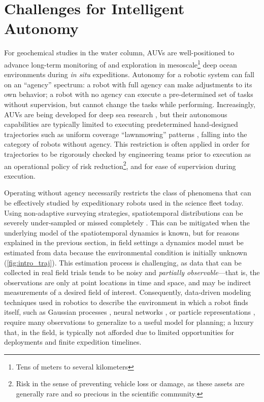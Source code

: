 \section{Challenges for Intelligent Autonomy}
For geochemical studies in the water column, AUVs are well-positioned to advance long-term monitoring of and exploration in mesoscale\footnote{Tens of meters to several kilometers} deep ocean environments during \emph{in situ} expeditions.
Autonomy for a robotic system can fall on an ``agency'' spectrum: a robot with full agency can make adjustments to its own behavior; a robot with no agency can execute a pre-determined set of tasks without supervision, but cannot change the tasks while performing.
Increasingly, AUVs are being developed for deep sea research \autocite{kaiser2016design,yuh2000design,okamoto2019visual,maki2014auv}, but their autonomous capabilities are typically limited to executing predetermined hand-designed trajectories such as uniform coverage ``lawnmowing'' patterns \autocite{camilli2010tracking}, falling into the category of robots without agency.
This restriction is often applied in order for trajectories to be rigorously checked by engineering teams prior to execution as an operational policy of risk reduction\footnote{Risk in the sense of preventing vehicle loss or damage, as these assets are generally rare and so precious in the scientific community.}, and for ease of supervision during execution.

Operating without agency necessarily restricts the class of phenomena that can be effectively studied by expeditionary robots used in the science fleet today.
Using non-adaptive surveying strategies, spatiotemporal distributions can be severely under-sampled or missed completely \autocite{flaspohler2019information, preston2019adaptive}.
This can be mitigated when the underlying model of the spatiotemporal dynamics is known, but for reasons explained in the previous section, in field settings a dynamics model must be estimated from data because the environmental condition is initially unknown (\cref{fig:intro_traj}).
This estimation process is challenging, as data that can be collected in real field trials tends to be noisy and \emph{partially observable}---that is, the observations are only at point locations in time and space, and may be indirect measurements of a desired field of interest. 
Consequently, data-driven modeling techniques used in robotics to describe the environment in which a robot finds itself, such as Gaussian processes \autocite{Rasmussen2004}, neural networks \autocite{cohn1994neural,wang2017predrnn}, or particle representations \autocite{Silver2010}, require many observations to generalize to a useful model for planning; a luxury that, in the field, is typically not afforded due to limited opportunities for deployments and finite expedition timelines.


